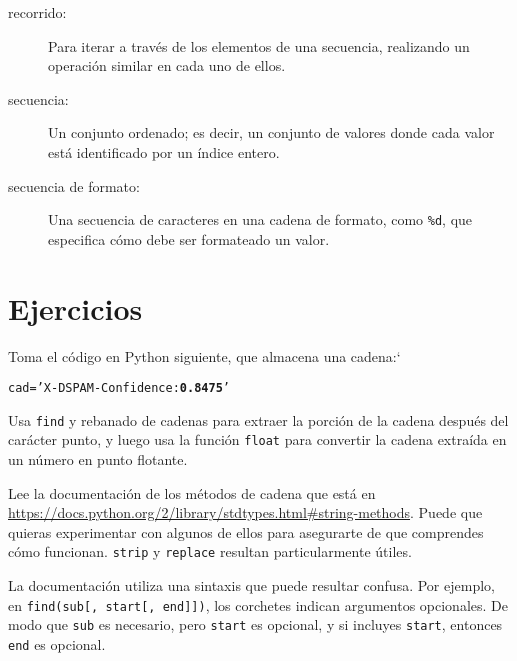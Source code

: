 \begin{description}
\item[recorrido:] Para iterar a través de los elementos de una secuencia,
realizando un operación similar en cada uno de ellos.

\item[secuencia:] Un conjunto ordenado; es decir, un conjunto de
valores donde cada valor está identificado por un índice entero.

\item[secuencia de formato:] Una secuencia de caracteres en una cadena de formato,
como {\tt \%d}, que especifica cómo debe ser formateado un valor.

\end{description}


\section{Ejercicios}

\begin{ex}
Toma el código en Python siguiente, que almacena una cadena:`

\beforeverb
\begin{alltt}
cad = 'X-DSPAM-Confidence: {\bf 0.8475}'
\end{alltt}
\afterverb

Usa {\tt find} y rebanado de cadenas para extraer la porción
de la cadena después del carácter punto, y luego usa la
función {\tt float} para convertir la cadena extraída en
un número en punto flotante.

\end{ex}


\begin{ex}

Lee la documentación de los métodos de cadena que está en
\url{https://docs.python.org/2/library/stdtypes.html#string-methods}.
Puede que quieras experimentar con algunos de ellos para asegurarte
de que comprendes cómo funcionan. {\tt strip} y
{\tt replace} resultan particularmente útiles.

La documentación utiliza una sintaxis que puede resultar confusa.
Por ejemplo, en \verb"find(sub[, start[, end]])", los corchetes
indican argumentos opcionales. De modo que {\tt sub} es necesario,
pero {\tt start} es opcional, y si incluyes {\tt start},
entonces {\tt end} es opcional.

\end{ex}

